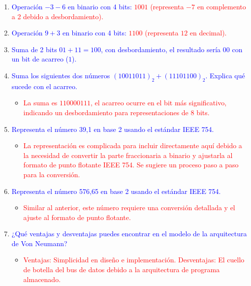 \documentclass{article}
\begin{document}
\begin{enumerate}
    \item \textcolor{blue}{Operación \(-3 - 6\) en binario con 4 bits:} \textcolor{red}{\(1001\) (representa \(-7\) en complemento a 2 debido a desbordamiento).}
    
    \item \textcolor{blue}{Operación \(9 + 3\) en binario con 4 bits:} \textcolor{red}{\(1100\) (representa \(12\) en decimal).}
    
    \item \textcolor{blue}{Suma de 2 bits \(01 + 11 = 100\), con desbordamiento, el resultado sería \(00\) con un bit de acarreo (\(1\)).}
    
    \item \textcolor{blue}{Suma los siguientes dos números \((10011011)_2 + (11101100)_2\). Explica qué sucede con el acarreo.}
    \begin{itemize}
        \item \textcolor{red}{La suma es \(110000111\), el acarreo ocurre en el bit más significativo, indicando un desbordamiento para representaciones de 8 bits.}
    \end{itemize}
    
    \item \textcolor{blue}{Representa el número 39,1 en base 2 usando el estándar IEEE 754.}
    \begin{itemize}
        \item \textcolor{red}{La representación es complicada para incluir directamente aquí debido a la necesidad de convertir la parte fraccionaria a binario y ajustarla al formato de punto flotante IEEE 754. Se sugiere un proceso paso a paso para la conversión.}
    \end{itemize}
    
    \item \textcolor{blue}{Representa el número 576,65 en base 2 usando el estándar IEEE 754.}
    \begin{itemize}
        \item \textcolor{red}{Similar al anterior, este número requiere una conversión detallada y el ajuste al formato de punto flotante.}
    \end{itemize}
    
    \item \textcolor{blue}{¿Qué ventajas y desventajas puedes encontrar en el modelo de la arquitectura de Von Neumann?}
    \begin{itemize}
        \item \textcolor{red}{Ventajas: Simplicidad en diseño e implementación. Desventajas: El cuello de botella del bus de datos debido a la arquitectura de programa almacenado.}
    \end{itemize}
    

\end{enumerate}
\end{document}
